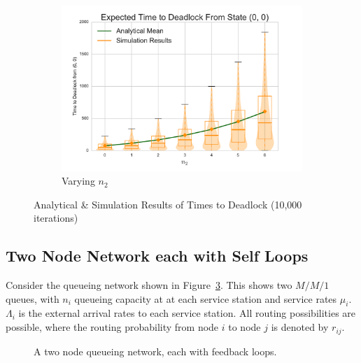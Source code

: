 \documentclass{article}
\begin{document}
\begin{center}
\begin{figure}[!htbp]
\begin{center}
\begin{subfigure}[b]{0.38\textwidth}
  \includegraphics[width=\textwidth]{images/varyn2}
  \caption{Varying $n_2$}
  \label{fig:timestodeadlock2_n2}
\end{subfigure}
\end{center}
\caption{Analytical \& Simulation Results of Times to Deadlock (10,000 iterations)}
\label{fig:timestodeadlock2}
\end{figure}
\end{center}


\subsection{Two Node Network each with Self Loops}\label{sec:2nodeselfloops}
Consider the queueing network shown in Figure~\ref{fig:queueingnetwork_2nodesfeedback}.
This shows two \(M/M/1\) queues, with \(n_i\) queueing capacity at at each service station and service rates $\mu_i$.
$\Lambda_i$ is the external arrival rates to each service station.
All routing possibilities are possible, where the routing probability from node $i$ to node $j$ is denoted by $r_{ij}$.

\begin{figure}[!htbp]
  
  \caption{A two node queueing network, each with feedback loops.}
  \label{fig:queueingnetwork_2nodesfeedback}
\end{figure}
\end{document}
